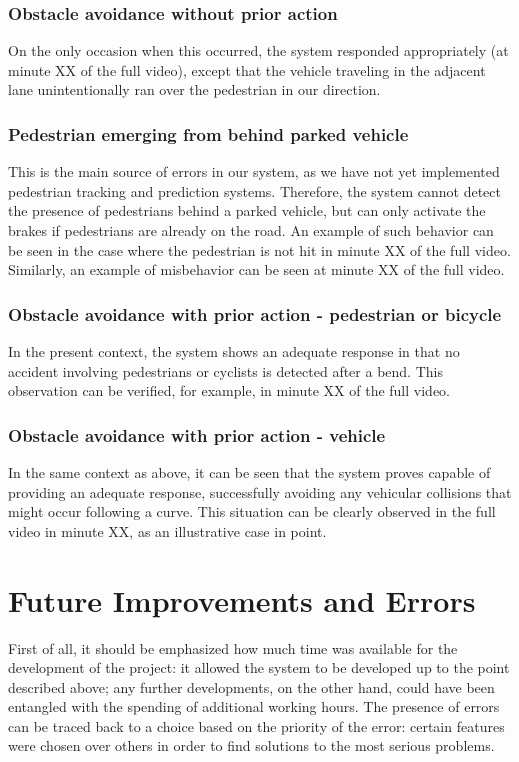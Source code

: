 \documentclass{article}
\begin{document}
\subsubsection{Obstacle avoidance without prior action}
On the only occasion when this occurred, the system responded appropriately (at minute XX of the full video), except that the vehicle traveling in the adjacent 
lane unintentionally ran over the pedestrian in our direction.
\subsubsection{Pedestrian emerging from behind parked vehicle}
This is the main source of errors in our system, as we have not yet implemented pedestrian tracking and prediction systems. Therefore, the system cannot detect 
the presence of pedestrians behind a parked vehicle, but can only activate the brakes if pedestrians are already on the road. An example of such behavior can 
be seen in the case where the pedestrian is not hit in minute XX of the full video. Similarly, an example of misbehavior can be seen at minute XX of the full video.
\subsubsection{Obstacle avoidance with prior action - pedestrian or bicycle}
In the present context, the system shows an adequate response in that no accident involving pedestrians or cyclists is detected after a bend. This observation can 
be verified, for example, in minute XX of the full video.
\subsubsection{Obstacle avoidance with prior action - vehicle}
In the same context as above, it can be seen that the system proves capable of providing an adequate response, successfully avoiding any vehicular collisions that might 
occur following a curve. This situation can be clearly observed in the full video in minute XX, as an illustrative case in point.

\section{Future Improvements and Errors}
First of all, it should be emphasized how much time was available for the development of the project: it allowed the system to 
be developed up to the point described above; any further developments, on the other hand, could have been entangled with the 
spending of additional working hours. 
The presence of errors can be traced back to a choice based on the priority of the error: certain features were chosen over 
others in order to find solutions to the most serious problems.
\end{document}
